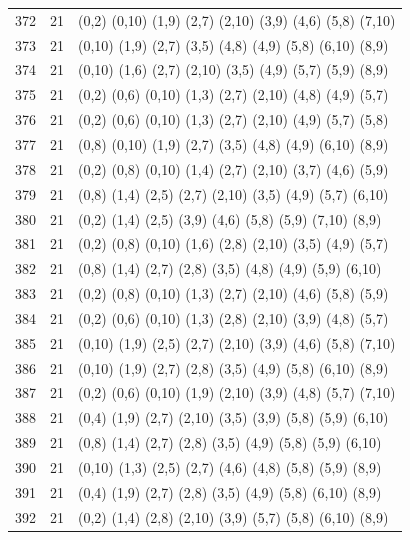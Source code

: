 \begin{appendix}
{\begin{longtable}{lll}
    372& 21 & (0,2)   (0,10)  (1,9)   (2,7)   (2,10)  (3,9)   (4,6)   (5,8)   (7,10)\\
    373& 21 & (0,10)  (1,9)   (2,7)   (3,5)   (4,8)   (4,9)   (5,8)   (6,10)  (8,9)\\
    374& 21 & (0,10)  (1,6)   (2,7)   (2,10)  (3,5)   (4,9)   (5,7)   (5,9)   (8,9)\\
    375& 21 & (0,2)   (0,6)   (0,10)  (1,3)   (2,7)   (2,10)  (4,8)   (4,9)   (5,7)\\
    376& 21 & (0,2)   (0,6)   (0,10)  (1,3)   (2,7)   (2,10)  (4,9)   (5,7)   (5,8)\\
    377& 21 & (0,8)   (0,10)  (1,9)   (2,7)   (3,5)   (4,8)   (4,9)   (6,10)  (8,9)\\
    378& 21 & (0,2)   (0,8)   (0,10)  (1,4)   (2,7)   (2,10)  (3,7)   (4,6)   (5,9)\\
    379& 21 & (0,8)   (1,4)   (2,5)   (2,7)   (2,10)  (3,5)   (4,9)   (5,7)   (6,10)\\
    380& 21 & (0,2)   (1,4)   (2,5)   (3,9)   (4,6)   (5,8)   (5,9)   (7,10)  (8,9)\\
    381& 21 & (0,2)   (0,8)   (0,10)  (1,6)   (2,8)   (2,10)  (3,5)   (4,9)   (5,7)\\
    382& 21 & (0,8)   (1,4)   (2,7)   (2,8)   (3,5)   (4,8)   (4,9)   (5,9)   (6,10)\\
    383& 21 & (0,2)   (0,8)   (0,10)  (1,3)   (2,7)   (2,10)  (4,6)   (5,8)   (5,9)\\
    384& 21 & (0,2)   (0,6)   (0,10)  (1,3)   (2,8)   (2,10)  (3,9)   (4,8)   (5,7)\\
    385& 21 & (0,10)  (1,9)   (2,5)   (2,7)   (2,10)  (3,9)   (4,6)   (5,8)   (7,10)\\
    386& 21 & (0,10)  (1,9)   (2,7)   (2,8)   (3,5)   (4,9)   (5,8)   (6,10)  (8,9)\\
    387& 21 & (0,2)   (0,6)   (0,10)  (1,9)   (2,10)  (3,9)   (4,8)   (5,7)   (7,10)\\
    388& 21 & (0,4)   (1,9)   (2,7)   (2,10)  (3,5)   (3,9)   (5,8)   (5,9)   (6,10)\\
    389& 21 & (0,8)   (1,4)   (2,7)   (2,8)   (3,5)   (4,9)   (5,8)   (5,9)   (6,10)\\
    390& 21 & (0,10)  (1,3)   (2,5)   (2,7)   (4,6)   (4,8)   (5,8)   (5,9)   (8,9)\\
    391& 21 & (0,4)   (1,9)   (2,7)   (2,8)   (3,5)   (4,9)   (5,8)   (6,10)  (8,9)\\
    392& 21 & (0,2)   (1,4)   (2,8)   (2,10)  (3,9)   (5,7)   (5,8)   (6,10)  (8,9)\\

\end{longtable}}
\end{appendix}
